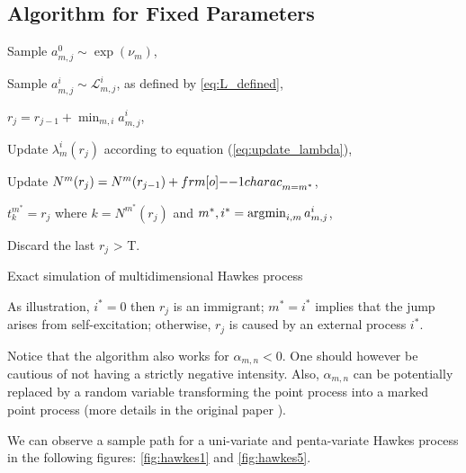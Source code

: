 \subsection{Algorithm for Fixed Parameters}



\begin{algorithm}[H]
\label{algo:simul_hp}
\SetAlgoLined

			{ 
					{
						{Sample $a_{m,j}^0 \sim \exp( \nu_m ) $,
						
							{Sample $a_{m,j}^i \sim  \mathcal L^i_{m,j} $, as defined by \ref{eq:L_defined},
							}
						}
						
						$r_j = r_{j-1} + \min_{m,i} a_{m,j}^i$,
						
							{Update $\lambda_m^i ( r_j )$ according to equation (\ref{eq:update_lambda}),
							
							Update $N^m ( r_j ) = N^m( r_{j-1} ) + {\11charac}_{m = m^*} $,}
					$t_k^{m^*} = r_j$ where $k = N^{m^*} ( r_j ) $ and $ m^*,i^* = \operatorname*{\arg\!\min}_{i,m} a_{m,j}^i $,
					}
			Discard the last $r_j$ > T.
			}
\caption{Exact simulation of multidimensional Hawkes process}
\end{algorithm}



\begin{remarque}
As illustration, $i^* = 0$ then $r_j$ is an immigrant; $m^* = i^*$ implies that the jump arises from self-excitation; otherwise, $r_j$ is caused by an external process $i^*$.
\end{remarque}

\begin{remarque}
Notice that the algorithm also works for $\alpha_{m,n} < 0$. One should however be cautious of not having a strictly negative intensity. Also, $\alpha_{m,n}$ can be potentially replaced by a random variable transforming the point process into a marked point process (more details in the original paper \cite{my_algo_simul}).
\end{remarque}

We can observe a sample path for a uni-variate and penta-variate Hawkes process in the following figures: \ref{fig:hawkes1} and \ref{fig:hawkes5}.

